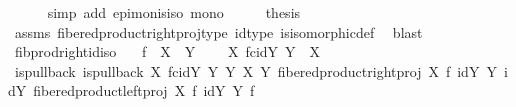 \begin{isabellebody}
\ \ \ \ \isamarkupfalse%
\ {\isacharparenleft}{\kern0pt}simp\ add{\isacharcolon}{\kern0pt}\ epi{\isacharunderscore}{\kern0pt}mon{\isacharunderscore}{\kern0pt}is{\isacharunderscore}{\kern0pt}iso\ mono{\isacharparenright}{\kern0pt}\isanewline
\ \ \isamarkupfalse%
\ \isamarkupfalse%
\ {\isacharquery}{\kern0pt}thesis\isanewline
\ \ \ \ \isamarkupfalse%
\ assms\ fibered{\isacharunderscore}{\kern0pt}product{\isacharunderscore}{\kern0pt}right{\isacharunderscore}{\kern0pt}proj{\isacharunderscore}{\kern0pt}type\ id{\isacharunderscore}{\kern0pt}type\ is{\isacharunderscore}{\kern0pt}isomorphic{\isacharunderscore}{\kern0pt}def\ \isamarkupfalse%
\ blast\isanewline
{}\isamarkupfalse%
%
\endisatagproof
{\isafoldproof}%
%
\isadelimproof
\isanewline
%
\endisadelimproof
\isanewline
{}\isamarkupfalse%
\ fib{\isacharunderscore}{\kern0pt}prod{\isacharunderscore}{\kern0pt}right{\isacharunderscore}{\kern0pt}id{\isacharunderscore}{\kern0pt}iso{\isacharcolon}{\kern0pt}\isanewline
\ \ \ {\isachardoublequoteopen}f\ {\isacharcolon}{\kern0pt}\ X\ {\isasymrightarrow}\ Y{\isachardoublequoteclose}\isanewline
\ \ \ \ {\isachardoublequoteopen}{\isacharparenleft}{\kern0pt}X\ \isactrlbsub f\isactrlesub {\isasymtimes}\isactrlsub c\isactrlbsub id{\isacharparenleft}{\kern0pt}Y{\isacharparenright}{\kern0pt}\isactrlesub \ Y{\isacharparenright}{\kern0pt}\ {\isasymcong}\ X{\isachardoublequoteclose}\isanewline
%
\isadelimproof
%
\endisadelimproof
%
\isatagproof
{}\isamarkupfalse%
\ {\isacharminus}{\kern0pt}\ \isanewline
\ \ \isamarkupfalse%
\ is{\isacharunderscore}{\kern0pt}pullback{\isacharcolon}{\kern0pt}\ {\isachardoublequoteopen}is{\isacharunderscore}{\kern0pt}pullback\ {\isacharparenleft}{\kern0pt}X\ \isactrlbsub f\isactrlesub {\isasymtimes}\isactrlsub c\isactrlbsub id{\isacharparenleft}{\kern0pt}Y{\isacharparenright}{\kern0pt}\isactrlesub \ Y{\isacharparenright}{\kern0pt}\ Y\ X\ Y\ {\isacharparenleft}{\kern0pt}fibered{\isacharunderscore}{\kern0pt}product{\isacharunderscore}{\kern0pt}right{\isacharunderscore}{\kern0pt}proj\ X\ f\ {\isacharparenleft}{\kern0pt}id{\isacharparenleft}{\kern0pt}Y{\isacharparenright}{\kern0pt}{\isacharparenright}{\kern0pt}\ Y{\isacharparenright}{\kern0pt}\ {\isacharparenleft}{\kern0pt}id{\isacharparenleft}{\kern0pt}Y{\isacharparenright}{\kern0pt}{\isacharparenright}{\kern0pt}\ {\isacharparenleft}{\kern0pt}fibered{\isacharunderscore}{\kern0pt}product{\isacharunderscore}{\kern0pt}left{\isacharunderscore}{\kern0pt}proj\ X\ f\ {\isacharparenleft}{\kern0pt}id{\isacharparenleft}{\kern0pt}Y{\isacharparenright}{\kern0pt}{\isacharparenright}{\kern0pt}\ Y{\isacharparenright}{\kern0pt}\ f\ {\isachardoublequoteclose}\isanewline

\end{isabellebody}
